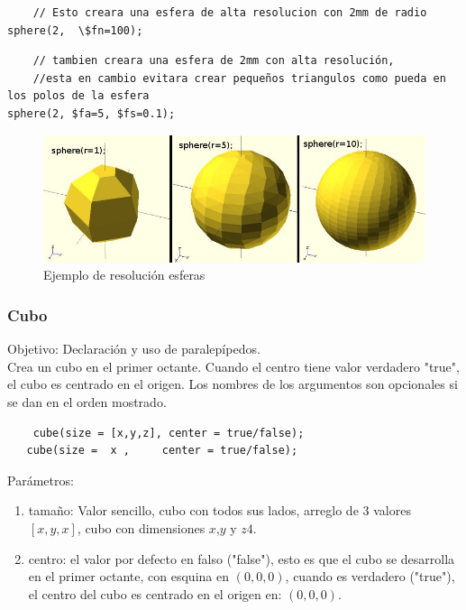 \documentclass{article}
\begin{document}
\begin{verbatim}
    // Esto creara una esfera de alta resolucion con 2mm de radio
sphere(2,  \$fn=100); 
\end{verbatim}

\begin{verbatim}
    // tambien creara una esfera de 2mm con alta resolución,
    //esta en cambio evitara crear pequeños triangulos como pueda en los polos de la esfera
sphere(2, $fa=5, $fs=0.1);
\end{verbatim}


\begin{figure}[h!]
    \centering
    \includegraphics[scale=0.8]{Imagenes/Openscad-sphere.jpg}
    \caption{Ejemplo de resolución esferas}
    \label{fig:resEsferas}
\end{figure}


\subsubsection{Cubo}

Objetivo: Declaración y uso de paralepípedos.\citep{OpenSCS}\\

Crea un cubo en el primer octante. Cuando el centro tiene valor verdadero "true", el cubo es centrado en el origen. Los nombres de los argumentos son opcionales si se dan en el orden mostrado.\citep{WikiOpensCAD}\\

\begin{verbatim}
    cube(size = [x,y,z], center = true/false);
   cube(size =  x ,     center = true/false);
\end{verbatim}

Parámetros:\\

\begin{enumerate}
    \item tamaño: Valor sencillo, cubo con todos sus lados, arreglo de 3 valores $[x,y,x]$, cubo con dimensiones $x$,$y$ y $z4$.
    
   \item centro: el valor por defecto en falso ("false"), esto es que el cubo se desarrolla en el primer octante, con esquina en $(0,0,0)$, cuando es verdadero ("true"), el centro del cubo es centrado en el origen en: $(0,0,0)$.

\end{enumerate}
\end{document}
